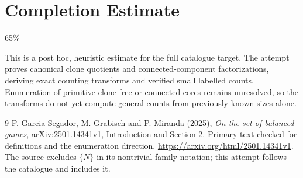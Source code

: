 \documentclass[11pt,a4paper]{article}
\begin{document}
\section{Completion Estimate}
65\%

This is a post hoc, heuristic estimate for the full catalogue target.
The attempt proves canonical clone quotients and connected-component factorizations, deriving exact counting transforms and verified small labelled counts. Enumeration of primitive clone-free or connected cores remains unresolved, so the transforms do not yet compute general counts from previously known sizes alone.

\begin{thebibliography}{9}
 P. Garcia-Segador, M. Grabisch and P. Miranda (2025), \emph{On the set of balanced games}, arXiv:2501.14341v1, Introduction and Section 2. Primary text checked for definitions and the enumeration direction. \url{https://arxiv.org/html/2501.14341v1}. The source excludes $\{N\}$ in its nontrivial-family notation; this attempt follows the catalogue and includes it.
\end{thebibliography}
\end{document}
